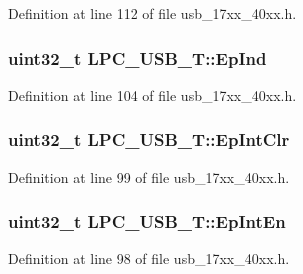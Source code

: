 Definition at line 112 of file usb\+\_\+17xx\+\_\+40xx.\+h.

\subsubsection[{\texorpdfstring{Ep\+Ind}{EpInd}}]{ uint32\+\_\+t L\+P\+C\+\_\+\+U\+S\+B\+\_\+\+T\+::\+Ep\+Ind}\hypertarget{structLPC__USB__T_ac8e8b4e911c524c9bc4fad1af1a4bb1e}{}\label{structLPC__USB__T_ac8e8b4e911c524c9bc4fad1af1a4bb1e}


Definition at line 104 of file usb\+\_\+17xx\+\_\+40xx.\+h.

\subsubsection[{\texorpdfstring{Ep\+Int\+Clr}{EpIntClr}}]{ uint32\+\_\+t L\+P\+C\+\_\+\+U\+S\+B\+\_\+\+T\+::\+Ep\+Int\+Clr}\hypertarget{structLPC__USB__T_a6525cfe528935452838526da96435bf1}{}\label{structLPC__USB__T_a6525cfe528935452838526da96435bf1}


Definition at line 99 of file usb\+\_\+17xx\+\_\+40xx.\+h.

\subsubsection[{\texorpdfstring{Ep\+Int\+En}{EpIntEn}}]{ uint32\+\_\+t L\+P\+C\+\_\+\+U\+S\+B\+\_\+\+T\+::\+Ep\+Int\+En}\hypertarget{structLPC__USB__T_a41f4c12a9fce1720a67038c09e446f18}{}\label{structLPC__USB__T_a41f4c12a9fce1720a67038c09e446f18}


Definition at line 98 of file usb\+\_\+17xx\+\_\+40xx.\+h.

